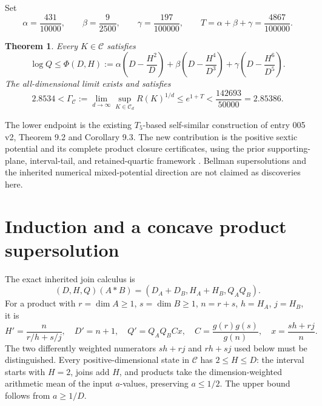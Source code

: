 \documentclass[11pt]{article}
\newtheorem{theorem}{Theorem}
\newcommand{\CC}{\mathcal C}
\begin{document}
Set
\[
 \alpha=\frac{431}{10000},\qquad \beta=\frac9{2500},\qquad
 \gamma=\frac{197}{100000},\qquad T=\alpha+\beta+\gamma=\frac{4867}{100000}.
\]
\begin{theorem}
Every $K\in\CC$ satisfies
\begin{equation}\label{eq:main}
 \log Q\le\Phi(D,H):=\alpha\left(D-\frac{H^2}{D}\right)
 +\beta\left(D-\frac{H^4}{D^3}\right)
 +\gamma\left(D-\frac{H^6}{D^5}\right).
\end{equation}
The all-dimensional limit exists and satisfies
\begin{equation}\label{eq:rate}
 2.8534<\Gamma_{\CC}:=\lim_{d\to\infty}\sup_{K\in\CC_d}R(K)^{1/d}
 \le e^{1+T}<\frac{142693}{50000}=2.85386.
\end{equation}
\end{theorem}
The lower endpoint is the existing $T_5$-based self-similar construction of entry 005 v2, Theorem 9.2 and Corollary 9.3. The new contribution is the positive sextic potential and its complete product closure certificates, using the prior supporting-plane, interval-tail, and retained-quartic framework \cite{mixed}. Bellman supersolutions and the inherited numerical mixed-potential direction are not claimed as discoveries here.

\section{Induction and a concave product supersolution}
The exact inherited join calculus is
\[
 (D,H,Q)(A*B)=(D_A+D_B,H_A+H_B,Q_AQ_B).
\]
For a product with $r=\dim A\ge1$, $s=\dim B\ge1$, $n=r+s$, $h=H_A$, $j=H_B$, it is
\[
 H'=\frac{n}{r/h+s/j},\quad D'=n+1,\quad Q'=Q_AQ_BCx,
 \quad C=\frac{g(r)g(s)}{g(n)},\quad x=\frac{sh+rj}{n}.
\]
The two differently weighted numerators $sh+rj$ and $rh+sj$ used below must be distinguished. Every positive-dimensional state in $\CC$ has $2\le H\le D$: the interval starts with $H=2$, joins add $H$, and products take the dimension-weighted arithmetic mean of the input $a$-values, preserving $a\le1/2$. The upper bound follows from $a\ge1/D$.
\end{document}
